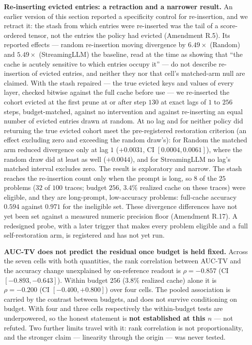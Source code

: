 \documentclass{article}
\begin{document}
\textbf{Re-inserting evicted entries: a retraction and a narrower result.} An
earlier version of this section reported a specificity control for
re-insertion, and we retract it: the stash from which entries were re-inserted
was the tail of a score-ordered tensor, not the entries the policy had evicted
(Amendment R.5). Its reported effects --- random re-insertion moving divergence
by $6.49\times$ (Random) and $5.49\times$ (StreamingLLM) the baseline, read at
the time as showing that ``the cache is acutely sensitive to which entries
occupy it'' --- do not describe re-insertion of evicted entries, and neither
they nor that cell's matched-arm null are claimed. With the stash repaired ---
the true evicted keys and values of every layer, checked bitwise against the
full cache before use --- we re-inserted the cohort evicted at the first prune
at or after step $130$ at exact lags of $1$ to $256$ steps, budget-matched,
against no intervention and against re-inserting an equal number of evicted
entries drawn at random. At no lag and for neither policy did returning the
true evicted cohort meet the pre-registered restoration criterion (an effect
excluding zero and exceeding the random draw's): for Random the matched arm
reduced divergence only at lag $1$ ($+0.0031$, CI $[0.0004, 0.0061]$), where
the random draw did at least as well ($+0.0044$), and for StreamingLLM no
lag's matched interval excludes zero. The result is exploratory and narrow. The
stash reaches the re-insertion count only when the prompt is long, so $8$ of
the $25$ problems ($32$ of $100$ traces; budget $256$, $3.4\%$ realized cache on
these traces) were eligible, and they are long-prompt, low-accuracy problems:
full-cache accuracy $0.594$ against $0.971$ for the ineligible set. These
divergence differences have not yet been set against a measured numeric
precision floor (Amendment R.17). A redesigned probe, with a later trigger that
makes every problem eligible and a full self-restoration arm, is registered and
has not yet run.

\textbf{AUC-TV does not predict the residual once budget is held fixed.} Across
the seven cells with both quantities, the rank correlation between AUC-TV and
the accuracy change unexplained by on-reference readout is $\rho = -0.857$ (CI
$[-0.893, -0.643]$). Within budget $256$ ($3.8\%$ realized cache) alone it is $\rho = -0.200$ (CI
$[-0.400, +0.800]$) over four cells. The pooled association is carried by the
contrast between budgets, and does not survive conditioning on budget. With
four and three cells respectively the within-budget tests are underpowered, so
the honest statement is \textbf{not established at this $n$} --- not refuted.
Two further limits travel with it: rank correlation is not proportionality, and
the stronger claim --- linearity through the origin --- was never tested.
\end{document}
